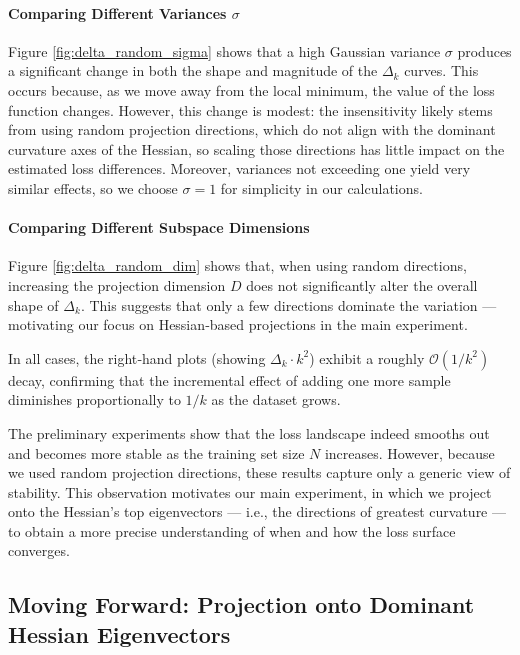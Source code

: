 \documentclass{article}
\begin{document}
\paragraph{Comparing Different Variances \texorpdfstring{$\sigma$}{sigma}}
Figure \ref{fig:delta_random_sigma} shows that a high Gaussian variance $\sigma$ produces a significant change in both the shape
and magnitude of the $\Delta_k$ curves. This occurs because, as we move away from the local minimum, the value of the loss
function changes. However, this change is modest: the insensitivity likely stems from using random projection directions,
which do not align with the dominant curvature axes of the Hessian, so scaling those directions has little impact on the estimated
loss differences. Moreover, variances not exceeding one yield very similar effects, so we choose $\sigma = 1$ for simplicity in our
calculations.

\paragraph{Comparing Different Subspace Dimensions}
Figure \ref{fig:delta_random_dim} shows that, when using random directions, increasing the projection dimension $D$ does not
significantly alter the overall shape of $\Delta_k$. This suggests that only a few directions dominate the variation --- motivating our
focus on Hessian‐based projections in the main experiment.

In all cases, the right‐hand plots (showing $\Delta_k \cdot k^2$) exhibit a roughly $\mathcal O(1 / k^2)$ decay, confirming that the
incremental effect of adding one more sample diminishes proportionally to $1 / k$ as the dataset grows.

The preliminary experiments show that the loss landscape indeed smooths out and becomes more stable as the training set size $N$
increases. However, because we used random projection directions, these results capture only a generic view of stability. This
observation motivates our main experiment, in which we project onto the Hessian’s top eigenvectors --- i.e., the directions of greatest
curvature --- to obtain a more precise understanding of when and how the loss surface converges.

\subsection{Moving Forward: Projection onto Dominant Hessian Eigenvectors}\label{sec:exp:hes}
\end{document}
